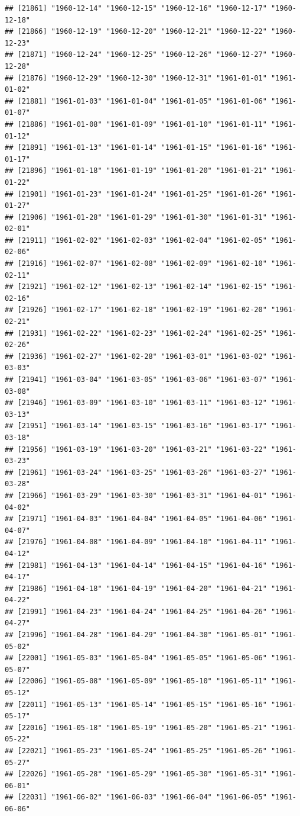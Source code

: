 \documentclass{article}\usepackage[]{graphicx}\usepackage[]{color}
\makeatletter
\newenvironment{kframe}{%
 \def\at@end@of@kframe{}%
 \ifinner\ifhmode%
  \def\at@end@of@kframe{\end{minipage}}%
  \begin{minipage}{\columnwidth}%
 \fi\fi%
 \def\FrameCommand##1{\hskip\@totalleftmargin \hskip-\fboxsep
 \colorbox{shadecolor}{##1}\hskip-\fboxsep
     \hskip-\linewidth \hskip-\@totalleftmargin \hskip\columnwidth}%
 \MakeFramed {\advance\hsize-\width
   \@totalleftmargin\z@ \linewidth\hsize
   \@setminipage}}%
 {\par\unskip\endMakeFramed%
 \at@end@of@kframe}
\newenvironment{knitrout}{}{} %
\makeatother
\begin{document}
\begin{description}
\begin{knitrout}
\begin{kframe}
\begin{verbatim}
## [21861] "1960-12-14" "1960-12-15" "1960-12-16" "1960-12-17" "1960-12-18"
## [21866] "1960-12-19" "1960-12-20" "1960-12-21" "1960-12-22" "1960-12-23"
## [21871] "1960-12-24" "1960-12-25" "1960-12-26" "1960-12-27" "1960-12-28"
## [21876] "1960-12-29" "1960-12-30" "1960-12-31" "1961-01-01" "1961-01-02"
## [21881] "1961-01-03" "1961-01-04" "1961-01-05" "1961-01-06" "1961-01-07"
## [21886] "1961-01-08" "1961-01-09" "1961-01-10" "1961-01-11" "1961-01-12"
## [21891] "1961-01-13" "1961-01-14" "1961-01-15" "1961-01-16" "1961-01-17"
## [21896] "1961-01-18" "1961-01-19" "1961-01-20" "1961-01-21" "1961-01-22"
## [21901] "1961-01-23" "1961-01-24" "1961-01-25" "1961-01-26" "1961-01-27"
## [21906] "1961-01-28" "1961-01-29" "1961-01-30" "1961-01-31" "1961-02-01"
## [21911] "1961-02-02" "1961-02-03" "1961-02-04" "1961-02-05" "1961-02-06"
## [21916] "1961-02-07" "1961-02-08" "1961-02-09" "1961-02-10" "1961-02-11"
## [21921] "1961-02-12" "1961-02-13" "1961-02-14" "1961-02-15" "1961-02-16"
## [21926] "1961-02-17" "1961-02-18" "1961-02-19" "1961-02-20" "1961-02-21"
## [21931] "1961-02-22" "1961-02-23" "1961-02-24" "1961-02-25" "1961-02-26"
## [21936] "1961-02-27" "1961-02-28" "1961-03-01" "1961-03-02" "1961-03-03"
## [21941] "1961-03-04" "1961-03-05" "1961-03-06" "1961-03-07" "1961-03-08"
## [21946] "1961-03-09" "1961-03-10" "1961-03-11" "1961-03-12" "1961-03-13"
## [21951] "1961-03-14" "1961-03-15" "1961-03-16" "1961-03-17" "1961-03-18"
## [21956] "1961-03-19" "1961-03-20" "1961-03-21" "1961-03-22" "1961-03-23"
## [21961] "1961-03-24" "1961-03-25" "1961-03-26" "1961-03-27" "1961-03-28"
## [21966] "1961-03-29" "1961-03-30" "1961-03-31" "1961-04-01" "1961-04-02"
## [21971] "1961-04-03" "1961-04-04" "1961-04-05" "1961-04-06" "1961-04-07"
## [21976] "1961-04-08" "1961-04-09" "1961-04-10" "1961-04-11" "1961-04-12"
## [21981] "1961-04-13" "1961-04-14" "1961-04-15" "1961-04-16" "1961-04-17"
## [21986] "1961-04-18" "1961-04-19" "1961-04-20" "1961-04-21" "1961-04-22"
## [21991] "1961-04-23" "1961-04-24" "1961-04-25" "1961-04-26" "1961-04-27"
## [21996] "1961-04-28" "1961-04-29" "1961-04-30" "1961-05-01" "1961-05-02"
## [22001] "1961-05-03" "1961-05-04" "1961-05-05" "1961-05-06" "1961-05-07"
## [22006] "1961-05-08" "1961-05-09" "1961-05-10" "1961-05-11" "1961-05-12"
## [22011] "1961-05-13" "1961-05-14" "1961-05-15" "1961-05-16" "1961-05-17"
## [22016] "1961-05-18" "1961-05-19" "1961-05-20" "1961-05-21" "1961-05-22"
## [22021] "1961-05-23" "1961-05-24" "1961-05-25" "1961-05-26" "1961-05-27"
## [22026] "1961-05-28" "1961-05-29" "1961-05-30" "1961-05-31" "1961-06-01"
## [22031] "1961-06-02" "1961-06-03" "1961-06-04" "1961-06-05" "1961-06-06"

\end{verbatim}
\end{kframe}
\end{knitrout}
\end{description}
\end{document}
